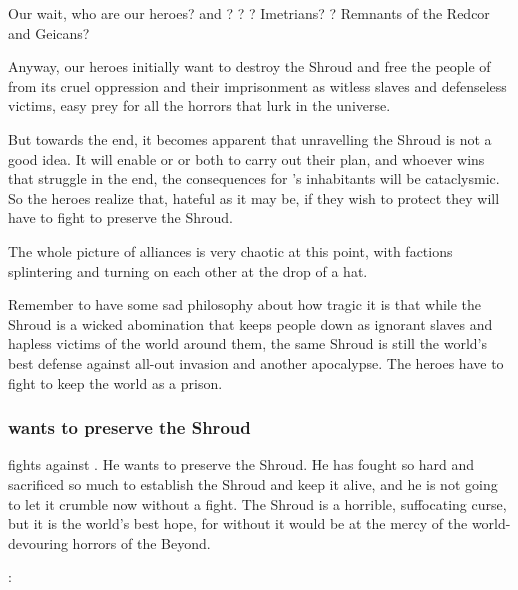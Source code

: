 Our \prikker wait, who are our heroes? \Narkiza{} and \Dzasselid? \MoroCobrel? \Cuezcans? Imetrians? \Ophidians? Remnants of the Redcor and Geicans?

Anyway, our heroes initially want to destroy the Shroud and free the people of \Miith{} from its cruel oppression and their imprisonment as witless slaves and defenseless victims, easy prey for all the horrors that lurk in the universe.

But towards the end, it becomes apparent that unravelling the Shroud is not a good idea. It will enable \Daggerrain{} or \Secherdamon{} or both to carry out their plan, and whoever wins that struggle in the end, the consequences for \Miith{}'s inhabitants will be cataclysmic. So the heroes realize that, hateful as it may be, if they wish to protect \Miith{} they will have to fight to preserve the Shroud.

The whole picture of alliances is very chaotic at this point, with factions splintering and turning on each other at the drop of a hat.

Remember to have some sad philosophy about how tragic it is that while the Shroud is a wicked abomination that keeps people down as ignorant slaves and hapless victims of the world around them, the same Shroud is still the world's best defense against all-out invasion and another apocalypse. 
The heroes have to fight to keep the world as a prison. 





\subsubsection{\Ishnaruchaefir wants to preserve the Shroud}
\Ishnaruchaefir fights against \Secherdamon.
He wants to preserve the Shroud. 
He has fought so hard and sacrificed so much to establish the Shroud and keep it alive, and he is not going to let it crumble now without a fight. 
The Shroud is a horrible, suffocating curse, but it is the world's best hope, for without it \Miith would be at the mercy of the world-devouring horrors of the Beyond. 

\Ishnaruchaefir: 

